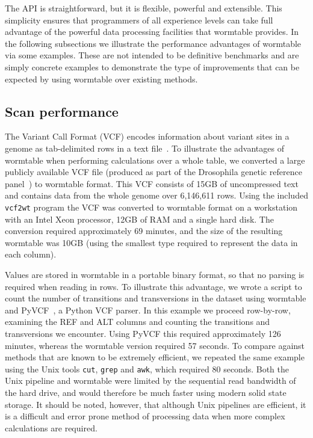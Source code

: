 \documentclass[10pt]{bmc_article}
\newenvironment{bmcformat}{\begin{raggedright}\baselineskip20pt\sloppy\setboolean{publ}{false}}{\end{raggedright}\baselineskip20pt\sloppy}
\begin{document}
\begin{bmcformat}
The API is straightforward, but it is flexible, powerful and 
extensible. This simplicity ensures that 
programmers of all experience levels  
can take full advantage of the powerful data 
processing facilities that wormtable provides. In the following subsections 
we illustrate the performance advantages of wormtable via some 
examples. These are not intended to be definitive benchmarks
and are simply concrete examples to demonstrate the type of improvements 
that can be expected by using wormtable over existing methods.

\subsection*{Scan performance}
The Variant Call Format (VCF) encodes information about variant sites in a genome 
as tab-delimited rows in a text file~\cite{da+11}.  
To illustrate the advantages of wormtable when performing calculations over 
a whole table, we converted a large 
publicly available VCF file (produced as part of the
Drosophila genetic reference panel~\cite{mr+12}) to wormtable format.
This VCF\cite{freeze.vcf}
consists of 15GB of uncompressed text and contains data from the 
whole genome over 6,146,611 rows.
Using the included \texttt{vcf2wt} program
the VCF was converted to wormtable format 
on a workstation with an Intel Xeon processor, 12GB of RAM 
and a single hard disk. The
conversion required approximately 69 minutes, and the size of the resulting  
wormtable was 10GB (using the smallest type required
to represent the data in each column).

Values are stored in wormtable in a portable binary format, so that no parsing is
required when reading in rows. To illustrate this advantage, we
wrote a script to count the number of transitions and transversions
in the dataset using wormtable and PyVCF~\cite{pyvcf},
a Python VCF parser.  In this example we proceed 
row-by-row, examining the REF and ALT columns and
counting the transitions and transversions we encounter. 
Using PyVCF this required approximately 126 minutes, whereas 
the wormtable version required
57 seconds. To compare against methods that are known to be extremely
efficient, we repeated the same 
example using the Unix tools \texttt{cut}, \texttt{grep} 
and \texttt{awk},  which required 80 seconds. Both the
Unix pipeline and wormtable were limited by the sequential read
bandwidth of the hard drive, and would therefore be much 
faster using modern solid state storage.
It should be noted, however, that although Unix 
pipelines are efficient, it is a difficult and error prone method 
of processing data when more complex calculations are required.


\end{bmcformat}
\end{document}
